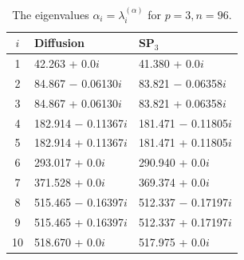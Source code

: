 \documentclass[authoryear]{elsarticle}
\begin{document}
\begin{table}[h]
\caption{The eigenvalues $\alpha_i=\lambda_i^{(\alpha)}$ for $p=3, n=96$.}
\label{tab:hwr_alpha_10}
\begin{center}
\begin{tabular}{c l l}
\hline
$i$ & Diffusion & SP$_3$ \\
\hline
1 &\phantom{0}42.263 + 0.0$i$       &41.380 + 0.0$i$ \\
2 &\phantom{0}84.867 $-$ 0.06130$i$ &83.821 $-$ 0.06358$i$ \\
3 &\phantom{0}84.867 + 0.06130$i$   &83.821 + 0.06358$i$ \\
4 &182.914 $-$ 0.11367$i$           &181.471 $-$ 0.11805$i$ \\
5 &182.914 + 0.11367$i$             &181.471 + 0.11805$i$ \\
6 &293.017 + 0.0$i$                 &290.940 + 0.0$i$ \\
7 &371.528 + 0.0$i$                 &369.374 + 0.0$i$ \\
8 &515.465 $-$ 0.16397$i$           &512.337 $-$ 0.17197$i$ \\
9 &515.465 + 0.16397$i$             &512.337 + 0.17197$i$ \\
10&518.670 + 0.0$i$                 &517.975 + 0.0$i$ \\
\hline
\end{tabular}
\end{center}
\end{table}
\end{document}
